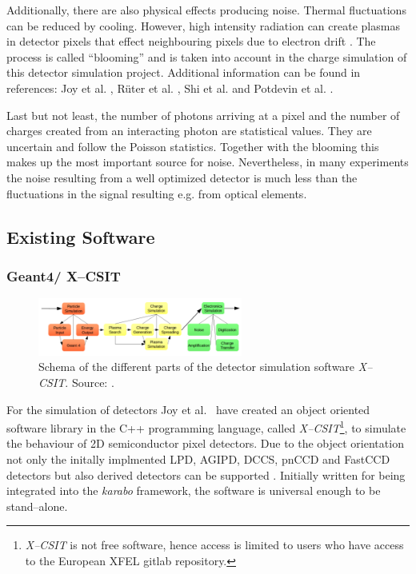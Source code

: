 Additionally, there
are also physical effects producing noise. Thermal fluctuations can be reduced
by cooling. However, high intensity radiation can create plasmas in detector
pixels that effect neighbouring pixels due to electron drift
\cite{potdevin2011analysis}. The process is called ``blooming'' and is
taken into account in the charge simulation of this detector simulation project.
Additional information can be found in references: Joy et al. \cite{Joy2015},
R\"uter et al. \cite{Rueter2016}, Shi et al. \cite{shi2010challenges} and Potdevin et al. \cite{potdevin2011analysis}.

Last but not least, the number of photons arriving at a pixel and the number of
charges created from an interacting photon are statistical values. They are
uncertain and follow the Poisson statistics. Together with the blooming this
makes up the most important source for noise. Nevertheless, in many experiments
the noise resulting from a well optimized detector is much less than the
fluctuations in the signal resulting e.g. from optical
elements\cite{potdevin2011analysis}.
%
\subsection{Existing Software}
\subsubsection{Geant4/ X--CSIT}
%
\begin{figure}
  \centering
  \includegraphics[width=0.6\textwidth]{figures/XCSIT.png}
  \caption{Schema of the different parts of the detector simulation software \textit{X--CSIT}. Source: \cite{Joy2015}.}
  \label{abb. XCSIT}
\end{figure}
%
For the simulation of detectors Joy et al.~\cite{Joy2015} have
created an object oriented software library in the C++ programming language,
called \textit{X--CSIT}\footnote{\textit{X--CSIT} is not free software, hence access
is limited to users who have access to the European
XFEL gitlab repository.}, to simulate the behaviour of 2D semiconductor pixel detectors. Due to
the object orientation not only the initally implmented LPD, AGIPD, DCCS, pnCCD
and FastCCD detectors but also derived detectors can be supported
\cite{Joy2015}. Initially written for being integrated into the \textit{karabo}
framework, the software is universal enough to be stand--alone.

